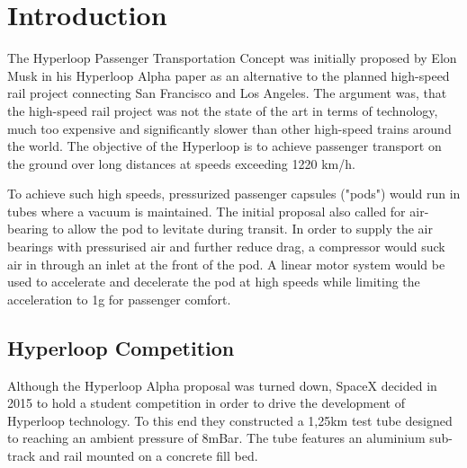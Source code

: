 
\chapter{Introduction}
The Hyperloop Passenger Transportation Concept was initially proposed by Elon Musk in his Hyperloop Alpha paper\cite{HyperloopAlpha} as an alternative to the planned high-speed rail project connecting San Francisco and Los Angeles. The argument was, that the high-speed rail project was not the state of the art in terms of technology, much too expensive and significantly slower than other high-speed trains around the world. The objective of the Hyperloop is to achieve passenger transport on the ground over long distances at speeds exceeding 1220 km/h.

To achieve such high speeds, pressurized passenger capsules ("pods") would run in tubes where a vacuum is maintained. The initial proposal also called for air-bearing to allow the pod to levitate during transit. In order to supply the air bearings with pressurised air and further reduce drag, a compressor would suck air in through an inlet at the front of the pod. A linear motor system would be used to accelerate and decelerate the pod at high speeds while limiting the acceleration to 1g for passenger comfort.

\section{Hyperloop Competition}

Although the Hyperloop Alpha proposal was turned down, SpaceX decided in 2015 to hold a student competition\cite{HyperloopCompetiton} in order to drive the development of Hyperloop technology. To this end they constructed a 1,25km test tube designed to reaching an ambient pressure of 8mBar. The tube features an aluminium sub-track and rail mounted on a concrete fill bed.

